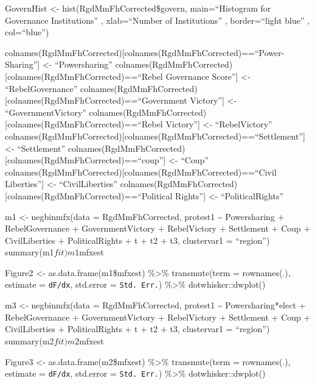 \documentclass[11pt,]{article}
\begin{document}
\vskip 6.5pt


\noindent \singlespacing GovernHist \textless{}- hist(RgdMmFhCorrected\$govern, main=``Histogram
for Governance Institutions'' , xlab=``Number of Institutions'' ,
border=``light blue'' , col=``blue'')

colnames(RgdMmFhCorrected){[}colnames(RgdMmFhCorrected)==``Power-Sharing''{]}
\textless{}- ``Powersharing''
colnames(RgdMmFhCorrected){[}colnames(RgdMmFhCorrected)==``Rebel
Governance Score''{]} \textless{}- ``RebelGovernance''
colnames(RgdMmFhCorrected){[}colnames(RgdMmFhCorrected)==``Government
Victory''{]} \textless{}- ``GovernmentVictory''
colnames(RgdMmFhCorrected){[}colnames(RgdMmFhCorrected)==``Rebel
Victory''{]} \textless{}- ``RebelVictory''
colnames(RgdMmFhCorrected){[}colnames(RgdMmFhCorrected)==``Settlement''{]}
\textless{}- ``Settlement''
colnames(RgdMmFhCorrected){[}colnames(RgdMmFhCorrected)==``coup''{]}
\textless{}- ``Coup''
colnames(RgdMmFhCorrected){[}colnames(RgdMmFhCorrected)==``Civil
Liberties''{]} \textless{}- ``CivilLiberties''
colnames(RgdMmFhCorrected){[}colnames(RgdMmFhCorrected)==``Political
Rights''{]} \textless{}- ``PoliticalRights''

m1 \textless{}- negbinmfx(data = RgdMmFhCorrected, protest1
\textasciitilde{} Powersharing + RebelGovernance + GovernmentVictory +
RebelVictory + Settlement + Coup + CivilLiberties + PoliticalRights + t
+ t2 + t3, clustervar1 = ``region'') summary(m1\(fit) m1\)mfxest

Figure2 \textless{}- as.data.frame(m1\$mfxest) \%\textgreater{}\%
transmute(term = rownames(.), estimate = \texttt{dF/dx}, std.error =
\texttt{Std.\ Err.}) \%\textgreater{}\% dotwhisker::dwplot()

m3 \textless{}- negbinmfx(data = RgdMmFhCorrected, protest1
\textasciitilde{} Powersharing*elect + RebelGovernance +
GovernmentVictory + RebelVictory + Settlement + Coup + CivilLiberties +
PoliticalRights + t + t2 + t3, clustervar1 = ``region'')
summary(m2\(fit) m2\)mfxest

Figure3 \textless{}- as.data.frame(m2\$mfxest) \%\textgreater{}\%
transmute(term = rownames(.), estimate = \texttt{dF/dx}, std.error =
\texttt{Std.\ Err.}) \%\textgreater{}\% dotwhisker::dwplot()
\end{document}

